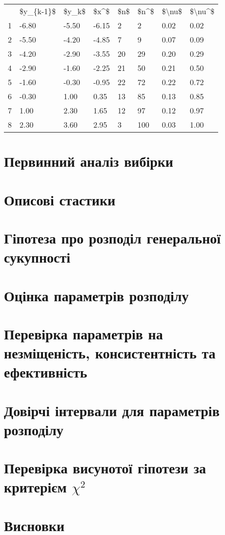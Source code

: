 \documentclass[14pt, a4paper, ukrainian]{extreport}
\begin{document}
	\begin{tabular}{llllllll}
	{} & \$y\_\{k-1\}\$ & \$y\_k\$ & \$x\textasciicircum *\$ & \$n\$ & \$n\textasciicircum *\$ & \$\textbackslash nu\$ & \$\textbackslash nu\textasciicircum *\$ \\
	1 &     -6.80 & -5.50 & -6.15 &   2 &     2 &  0.02 &    0.02 \\
	2 &     -5.50 & -4.20 & -4.85 &   7 &     9 &  0.07 &    0.09 \\
	3 &     -4.20 & -2.90 & -3.55 &  20 &    29 &  0.20 &    0.29 \\
	4 &     -2.90 & -1.60 & -2.25 &  21 &    50 &  0.21 &    0.50 \\
	5 &     -1.60 & -0.30 & -0.95 &  22 &    72 &  0.22 &    0.72 \\
	6 &     -0.30 &  1.00 &  0.35 &  13 &    85 &  0.13 &    0.85 \\
	7 &      1.00 &  2.30 &  1.65 &  12 &    97 &  0.12 &    0.97 \\
	8 &      2.30 &  3.60 &  2.95 &   3 &   100 &  0.03 &    1.00 \\
	\end{tabular}
	
	\chapter{Первинний аналіз вибірки}
	\chapter{Описові стастики}
	\chapter{Гіпотеза про розподіл генеральної сукупності}
	\chapter{Оцінка параметрів розподілу}
	\chapter{Перевірка параметрів на незміщеність, консистентність та ефективність}
	\chapter{Довірчі інтервали для параметрів розподілу}
	\chapter{Перевірка висунотої гіпотези за критерієм $\chi^2$}
	\chapter*{Висновки}
	
	
\end{document}
